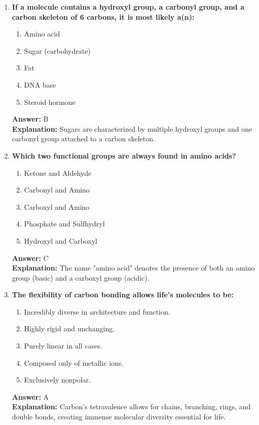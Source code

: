 \documentclass[11pt, a4paper]{article}
\begin{document}
\begin{enumerate}
\item \textbf{If a molecule contains a hydroxyl group, a carbonyl group, and a carbon skeleton of 6 carbons, it is most likely a(n):}
\begin{enumerate}[label=\Alph*.]
    \item Amino acid
    \item Sugar (carbohydrate)
    \item Fat
    \item DNA base
    \item Steroid hormone
\end{enumerate}
\textbf{Answer:} B \\
\textbf{Explanation:} Sugars are characterized by multiple hydroxyl groups and one carbonyl group attached to a carbon skeleton.

\item \textbf{Which two functional groups are always found in amino acids?}
\begin{enumerate}[label=\Alph*.]
    \item Ketone and Aldehyde
    \item Carbonyl and Amino
    \item Carboxyl and Amino
    \item Phosphate and Sulfhydryl
    \item Hydroxyl and Carboxyl
\end{enumerate}
\textbf{Answer:} C \\
\textbf{Explanation:} The name "amino acid" denotes the presence of both an amino group (basic) and a carboxyl group (acidic).

\item \textbf{The flexibility of carbon bonding allows life's molecules to be:}
\begin{enumerate}[label=\Alph*.]
    \item Incredibly diverse in architecture and function.
    \item Highly rigid and unchanging.
    \item Purely linear in all cases.
    \item Composed only of metallic ions.
    \item Exclusively nonpolar.
\end{enumerate}
\textbf{Answer:} A \\
\textbf{Explanation:} Carbon's tetravalence allows for chains, branching, rings, and double bonds, creating immense molecular diversity essential for life.

\end{enumerate}
\end{document}
